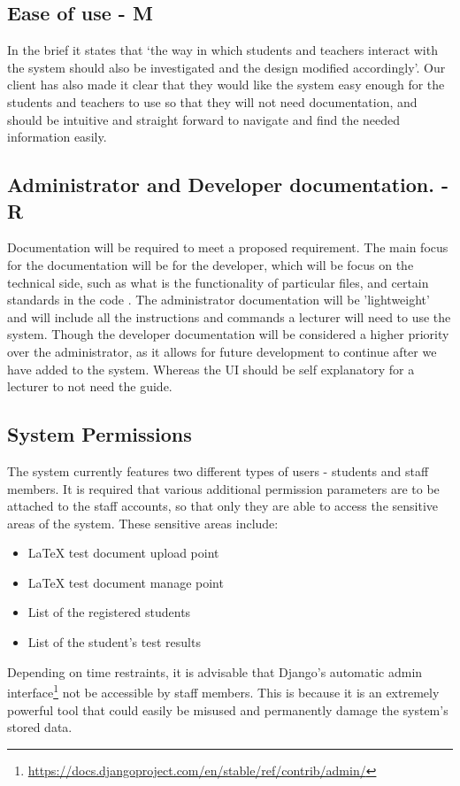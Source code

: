 \documentclass[12pt]{article}
\begin{document}
	\subsection{Ease of use - M}
	In the brief it states that ‘the way in which students and teachers interact with the system should also be investigated and the design modified accordingly’. Our client has also made it clear that they would like the system easy enough for the students and teachers to use so that they will not need documentation, and should be intuitive and straight forward to navigate and find the needed information easily.
	\subsection{Administrator and Developer documentation. - R}
	Documentation will be required to meet a proposed requirement. The main focus for the documentation will be for the developer, which will be focus on the technical side, such as what is the functionality of particular files, and certain standards in the code . The administrator documentation will be 'lightweight' and will include all the instructions and commands a lecturer will need to use the system. Though the developer documentation will be considered a higher priority over the administrator, as it allows for future development to continue after we have added to the system. Whereas the UI should be self explanatory for a lecturer to not need the guide. 
	\subsection{System Permissions}
	The system currently features two different types of users - students and staff members. It is required that various additional permission parameters are to be attached to the staff accounts, so that only they are able to access the sensitive areas of the system. These sensitive areas include:
	\begin{itemize}  
        \item LaTeX test document upload point
        \item LaTeX test document manage point
        \item List of the registered students
        \item List of the student's test results
    \end{itemize}
    Depending on time restraints, it is advisable that Django's automatic admin interface\footnote{\url{https://docs.djangoproject.com/en/stable/ref/contrib/admin/}} not be accessible by staff members. This is because it is an extremely powerful tool that could easily be misused and permanently damage the system's stored data.
\end{document}
